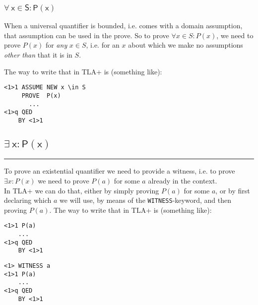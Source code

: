 \documentclass{article}
\newcommand{\code}[1]{\mathsf{#1}}
\begin{document}
\subsubsection{$\code{\forall\ x \in S : P(x)}$}
\vspace{10pt}
\begin{minipage}{230pt}
When a universal quantifier is bounded, i.e. comes with a domain
assumption, that assumption can be used in the prove. So to prove
$\forall x \in S : P(x)$, we need to prove $P(x)$ for
\emph{any} $x \in S$, i.e. for an $x$ about which we make
no assumptions \emph{other than} that it is in $S$. \\


\vspace{5pt}

The way to write that in TLA+ is (something like):
\end{minipage}
%
\hspace{15pt} \vline \hspace{15pt}
%
\begin{minipage}{80pt}
\begin{verbatim}
<1>1 ASSUME NEW x \in S
     PROVE  P(x)
       ...
<1>q QED
    BY <1>1
\end{verbatim}
\end{minipage}


\subsection{$\code{\exists\ x : P(x)}$}
\hrule
\vspace{10pt}
\begin{minipage}{230pt}
To prove an existential quantifier we need to provide a witness, 
i.e. to prove $\exists x : P(x)$ we need to prove $P(a)$ for some
$a$ already in the context. \\

\vspace{5pt} 
In TLA+ we can do that, either by simply proving $P(a)$
for some $a$, or by first declaring which $a$ we will use, by means of
the \verb|WITNESS|-keyword, and then proving $P(a)$.
The way to write that in TLA+ is (something like):
\end{minipage}
%
\hspace{15pt} \vline \hspace{15pt}
%
\begin{minipage}{80pt}
\begin{verbatim}
<1>1 P(a)
    ...
<1>q QED
    BY <1>1
\end{verbatim}
\vspace{0pt}
\end{minipage}
\hspace{25pt} \vline \hspace{20pt}
\begin{minipage}{80pt}
\begin{verbatim}
<1> WITNESS a
<1>1 P(a)
    ...
<1>q QED
    BY <1>1
\end{verbatim}
\end{minipage}
\end{document}
